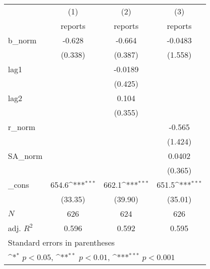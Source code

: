 {
\def\sym#1{\ifmmode^{#1}\else\(^{#1}\)\fi}
\begin{tabular}{l*{3}{c}}
\hline\hline
            &\multicolumn{1}{c}{(1)}&\multicolumn{1}{c}{(2)}&\multicolumn{1}{c}{(3)}\\
            &\multicolumn{1}{c}{reports}&\multicolumn{1}{c}{reports}&\multicolumn{1}{c}{reports}\\
\hline
b\_norm      &      -0.628         &      -0.664         &     -0.0483         \\
            &     (0.338)         &     (0.387)         &     (1.558)         \\
[1em]
lag1        &                     &     -0.0189         &                     \\
            &                     &     (0.425)         &                     \\
[1em]
lag2        &                     &       0.104         &                     \\
            &                     &     (0.355)         &                     \\
[1em]
r\_norm      &                     &                     &      -0.565         \\
            &                     &                     &     (1.424)         \\
[1em]
SA\_norm     &                     &                     &      0.0402         \\
            &                     &                     &     (0.365)         \\
[1em]
\_cons      &       654.6\sym{***}&       662.1\sym{***}&       651.5\sym{***}\\
            &     (33.35)         &     (39.90)         &     (35.01)         \\
\hline
\(N\)       &         626         &         624         &         626         \\
adj. \(R^{2}\)&       0.596         &       0.592         &       0.595         \\
\hline\hline
\multicolumn{4}{l}{\footnotesize Standard errors in parentheses}\\
\multicolumn{4}{l}{\footnotesize \sym{*} \(p<0.05\), \sym{**} \(p<0.01\), \sym{***} \(p<0.001\)}\\
\end{tabular}
}
